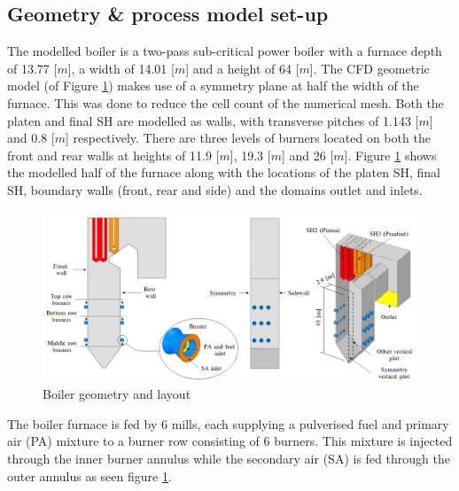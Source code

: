 \documentclass[review]{elsarticle}
\begin{document}
\subsection{Geometry \& process model set-up}
The modelled  boiler is a two-pass sub-critical power boiler with a furnace depth of 13.77 [$m$], a width of 14.01 [$m$] and a height of 64 [$m$]. The CFD geometric model (of Figure \ref{fig_geometry}) makes use of a symmetry plane at half the width of the furnace. This was done to reduce the cell count of the numerical mesh. Both the platen and final SH are modelled as walls, with transverse pitches of 1.143 [$m$] and 0.8 [$m$] respectively. There are three levels of burners located on both the front and rear walls at heights of 11.9 [$m$], 19.3 [$m$] and 26 [$m$]. Figure \ref{fig_geometry} shows the modelled half of the furnace along with the locations of the platen SH, final SH, boundary walls (front, rear and side) and the domains outlet and inlets.\\
\begin{figure} [h!]
\centering
\includegraphics[scale=0.4]{GEOMETRY}
\caption{Boiler geometry and layout}
\label{fig_geometry}
\end{figure}

The boiler furnace is fed by 6 mills, each supplying a pulverised fuel and primary air (PA) mixture to a burner row consisting of 6 burners. This mixture is injected through the inner burner annulus while the secondary air (SA) is fed through the outer annulus as seen figure \ref{fig_geometry}. 
\end{document}
